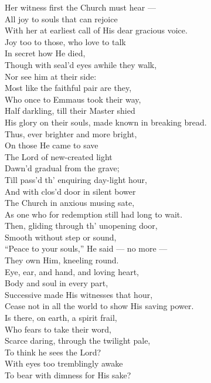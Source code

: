  Her witness first the Church must hear — \\
 All joy to souls that can rejoice \\
 With her at earliest call of His dear gracious voice. \\
  Joy too to those, who love to talk \\
 In secret how He died, \\
 Though with seal’d eyes awhile they walk, \\
 Nor see him at their side: \\
 Most like the faithful pair are they, \\
 Who once to Emmaus took their way, \\
 Half darkling, till their Master shied \\
 His glory on their souls, made known in breaking bread. \\
  Thus, ever brighter and more bright, \\
 On those He came to save \\
 The Lord of new-created light \\
 Dawn’d gradual from the grave; \\
 Till pass’d th’ enquiring day-light hour, \\
 And with clos’d door in silent bower \\
 The Church in anxious musing sate, \\
 As one who for redemption still had long to wait. \\
  Then, gliding through th’ unopening door, \\
 Smooth without step or sound, \\
 “Peace to your souls,” He said — no more — \\
 They own Him, kneeling round. \\
 Eye, ear, and hand, and loving heart, \\
 Body and soul in every part, \\
 Successive made His witnesses that hour, \\
 Cease not in all the world to show His saving power. \\
  Is there, on earth, a spirit frail, \\
 Who fears to take their word, \\
 Scarce daring, through the twilight pale, \\
 To think he sees the Lord? \\
 With eyes too tremblingly awake \\
 To bear with dimness for His sake? \\
